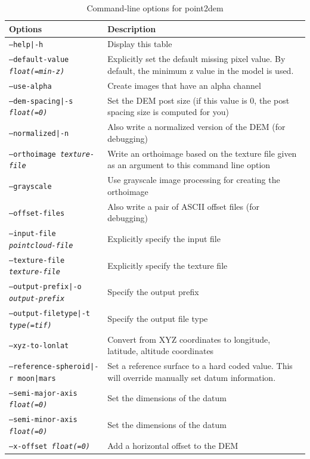 \begin{longtable}{|l|p{10cm}|}
\caption{Command-line options for point2dem}
\label{tbl:point2dem}
\endfirsthead
\endhead
\endfoot
\endlastfoot
\hline
Options & Description \\ \hline \hline
\texttt{--help|-h} & Display this table \\ \hline
\texttt{--default-value \textit{float(=min-z)}} & Explicitly set the default missing pixel value. By default, the minimum z value in the model is used. \\ \hline
\texttt{--use-alpha} & Create images that have an alpha channel \\ \hline
\texttt{--dem-spacing|-s \textit{float(=0)}} & Set the \ac{DEM} post size (if this value is 0, the post spacing size is computed for you) \\ \hline
\texttt{--normalized|-n} & Also write a normalized version of the \ac{DEM} (for debugging) \\ \hline
\texttt{--orthoimage \textit{texture-file}} & Write an orthoimage based on the texture file given as an argument to this command line option \\ \hline
\texttt{--grayscale} & Use grayscale image processing for creating the orthoimage \\ \hline
\texttt{--offset-files} & Also write a pair of ASCII offset files (for debugging) \\ \hline
\texttt{--input-file \textit{pointcloud-file}} & Explicitly specify the input file \\ \hline
\texttt{--texture-file \textit{texture-file}} & Explicitly specify the texture file \\ \hline
\texttt{--output-prefix|-o \textit{output-prefix}} & Specify the output prefix \\ \hline
\texttt{--output-filetype|-t \textit{type(=tif)}} & Specify the output file type \\ \hline
\texttt{--xyz-to-lonlat} & Convert from XYZ coordinates to longitude, latitude, altitude coordinates \\ \hline
\texttt{--reference-spheroid|-r moon|mars} & Set a reference surface to a hard coded value. This will override manually set datum information. \\ \hline
\texttt{--semi-major-axis \textit{float(=0)}} & Set the dimensions of the datum \\ \hline
\texttt{--semi-minor-axis \textit{float(=0)}} & Set the dimensions of the datum \\ \hline
\texttt{--x-offset \textit{float(=0)}} & Add a horizontal offset to the \ac{DEM} \\ \hline

\end{longtable}
